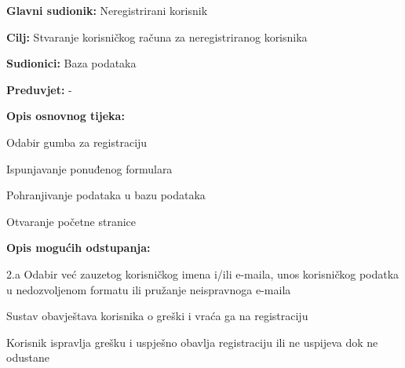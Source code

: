 \documentclass{article}
\begin{document}
		\begin{packed_item}
			
			\item \textbf{Glavni sudionik: }Neregistrirani korisnik
			\item  \textbf{Cilj:} Stvaranje korisničkog računa za neregistriranog korisnika
			\item  \textbf{Sudionici:} Baza podataka
			\item  \textbf{Preduvjet:} -
			\item  \textbf{Opis osnovnog tijeka:}
			
			\item[] \begin{packed_enum}
				\item Odabir gumba za registraciju
				\item Ispunjavanje ponuđenog formulara
				\item Pohranjivanje podataka u bazu podataka
				\item Otvaranje početne stranice 
			\end{packed_enum}
			
			\item  \textbf{Opis mogućih odstupanja:}
			
			\item[] \begin{packed_item}
				
				\item[2.a] Odabir već zauzetog korisničkog imena i/ili e-maila, unos korisničkog podatka u nedozvoljenom formatu ili pružanje neispravnoga e-maila
				\item[] \begin{packed_enum}
					\item Sustav obavještava korisnika o greški i vraća ga na registraciju 
					\item Korisnik ispravlja grešku i uspješno obavlja registraciju ili ne uspijeva dok ne odustane
				\end{packed_enum}
			\end{packed_item}
		\end{packed_item}
	
\end{document}
